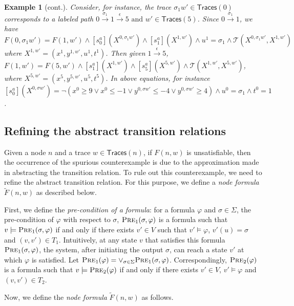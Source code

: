 \documentclass[letterpaper, 10 pt, conference]{ieeeconf}
\newtheorem{example}{Example}
\begin{document}
\begin{example}[cont.]
 Consider, for instance, the trace
  $\sigma_1w'\in \mathsf{Traces}(0)$ corresponds to a labeled path
  $ 0\xrightarrow{\sigma_1} 1 \xrightarrow{\epsilon } 5 \text{ and } w'\in
  \mathsf{Traces}(5)$. Since $0\xrightarrow{\sigma_1}1$, we have 
$F(0, \sigma_1w')= F(1,w') \land [s^a_0](X^{0, \sigma_1w'})\land
[s^a_1](X^{1,w'}) \land 
u^1=\sigma_1\land \mathcal{T}(X^{0, \sigma_1w'}, X^{1,w'})
$ where $X^{1,w'}= (x^1,y^{1,w'},u^1,t^1)$. Then given $1\xrightarrow{\epsilon}5$,
$F(1,w')= F(5,w') \land [s^a_1](X^{1,w'}) \land [s^a_5](X^{5,w'})
 \land
\mathcal{T}(X^{1,w'}, X^{5,w'})
$, where $X^{5,w'}= (x^5,y^{5,w'},u^5,t^5)$. In above equations, for instance
$[s^a_0](X^{0,\sigma w'})= \neg (x^0 \ge 9 \lor x^0 \le -1 \lor
y^{0,\sigma w'} \le -4 \lor y^{0,\sigma w'} \ge 4) \land
 u^0=\sigma_1 \land t^0=1$.
\end{example}

\subsection{Refining the abstract transition relations}
\label{subsec:refinetrans}


Given a node $n$ and a trace $w \in \mathsf{Traces}(n)$, if $F(n,w)$
is unsatisfiable, then the occurrence of the spurious counterexample
is due to the approximation made in abstracting the transition
relation. To rule out this counterexample, we need to refine the
abstract transition relation. For this purpose, we define a \emph{node
  formula} $\tilde{F}(n,w)$ as described below.

First, we define the \emph{pre-condition of a formula}: for a
formula $\varphi$ and $\sigma\in \Sigma$, the pre-condition of
$\varphi$ with respect to $\sigma$, $\textsc{Pre}_1(\sigma,\varphi)$
is a formula such that $v \models \textsc{Pre}_1(\sigma, \varphi)$ if and only if
there exists $v'\in V$ such that $v' \models \varphi$, $v'(u)=\sigma$
and $ (v,v') \in T_1 $. Intuitively, at any state $v$ that satisfies
this formula $\textsc{Pre}_1(\sigma,\varphi)$, the system, after
initiating the output $\sigma$, can reach a state $v'$ at which
$\varphi$ is satisfied.  Let $\textsc{Pre}_1(\varphi)=\lor_{\sigma \in
  \Sigma} \textsc{Pre}_1(\sigma,\varphi)$. Correspondingly,
$\textsc{Pre}_2(\varphi)$ is a formula such that $v \models
\textsc{Pre}_2(\varphi)$ if and only if there exists $v' \in V$, $v'\models \varphi$ and
$(v,v')\in T_2$.

Now, we define the \emph{node formula} $\tilde{F}(n,w)$ as follows.
\end{document}
